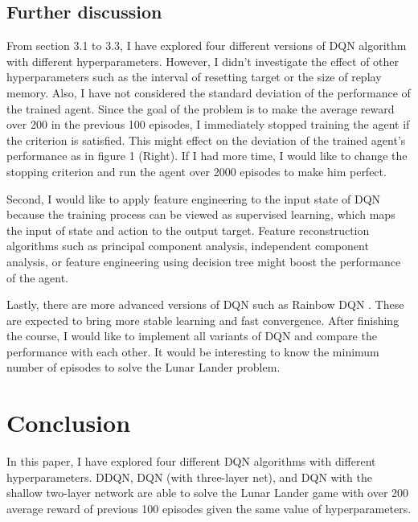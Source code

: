 \documentclass{article}
\begin{document}
\subsection{Further discussion}
From section 3.1 to 3.3, I have explored four different versions of DQN algorithm with different hyperparameters. However, I didn't investigate the effect of other hyperparameters such as the interval of resetting target or the size of replay memory. Also, I have not considered the standard deviation of the performance of the trained agent. Since the goal of the problem is to make the average reward over 200 in the previous 100 episodes, I immediately stopped training the agent if the criterion is satisfied. This might effect on the deviation of the trained agent's performance as in figure 1 (Right). If I had more time, I would like to change the stopping criterion and run the agent over 2000 episodes to make him perfect. 

Second, I would like to apply feature engineering to the input state of DQN because the training process can be viewed as supervised learning, which maps the input of state and action to the output target. Feature reconstruction algorithms such as principal component analysis, independent component analysis, or feature engineering using decision tree might boost the performance of the agent.

Lastly, there are more advanced versions of DQN such as Rainbow DQN \cite{hessel2018rainbow}. These are expected to bring more stable learning and fast convergence. After finishing the course, I would like to implement all variants of DQN and compare the performance with each other. It would be interesting to know the minimum number of episodes to solve the Lunar Lander problem. 

\section{Conclusion}
In this paper, I have explored four different DQN algorithms with different hyperparameters. DDQN, DQN (with three-layer net), and DQN with the shallow two-layer network are able to solve the Lunar Lander game with over 200 average reward of previous 100 episodes given the same value of hyperparameters. 



\end{document}
